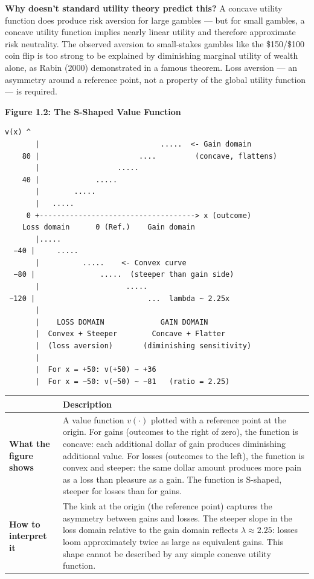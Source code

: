 \documentclass[12pt, letterpaper]{article}
\begin{document}
\textbf{Why doesn't standard utility theory predict this?} A concave utility function does produce risk aversion for large gambles --- but for small gambles, a concave utility function implies nearly linear utility and therefore approximate risk neutrality. The observed aversion to small-stakes gambles like the \$150/\$100 coin flip is too strong to be explained by diminishing marginal utility of wealth alone, as Rabin (2000) demonstrated in a famous theorem. Loss aversion --- an asymmetry around a reference point, not a property of the global utility function --- is required.

\textbf{Figure 1.2: The S-Shaped Value Function}

\begin{lstlisting}[caption={}]
  v(x) ^
       |                            .....  <- Gain domain
    80 |                       ....         (concave, flattens)
       |                  .....
    40 |             .....
       |        .....
       |   .....
     0 +------------------------------------> x (outcome)
    Loss domain      0 (Ref.)    Gain domain
       |.....
  −40 |     .....
       |          .....    <- Convex curve
  −80 |               .....  (steeper than gain side)
       |                    .....
 −120 |                          ...  lambda ~ 2.25x
       |
       |    LOSS DOMAIN             GAIN DOMAIN
       |  Convex + Steeper        Concave + Flatter
       |  (loss aversion)       (diminishing sensitivity)
       |
       |  For x = +50: v(+50) ~ +36
       |  For x = −50: v(−50) ~ −81   (ratio = 2.25)
\end{lstlisting}


\begin{table}[H]
\centering
\small
\begin{tabularx}{\linewidth}{lY}
\toprule
 & Description \\
\midrule
\textbf{What the figure shows} & A value function $v(\cdot)$ plotted with a reference point at the origin. For gains (outcomes to the right of zero), the function is concave: each additional dollar of gain produces diminishing additional value. For losses (outcomes to the left), the function is convex and steeper: the same dollar amount produces more pain as a loss than pleasure as a gain. The function is S-shaped, steeper for losses than for gains. \\
\textbf{How to interpret it} & The kink at the origin (the reference point) captures the asymmetry between gains and losses. The steeper slope in the loss domain relative to the gain domain reflects $\lambda \approx 2.25$: losses loom approximately twice as large as equivalent gains. This shape cannot be described by any simple concave utility function. \\
\bottomrule
\end{tabularx}
\end{table}
\end{document}
